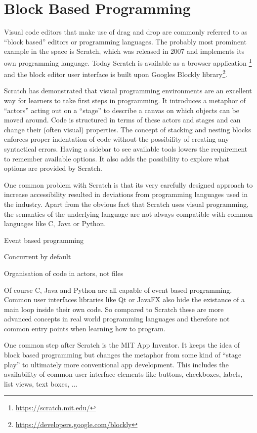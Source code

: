 \documentclass[]{report}
\begin{document}
\section{Block Based Programming}
\label{sec:block-based-programming}

Visual code editors that make use of drag and drop are commonly referred to as \enquote{block based} editors or programming languages. The probably most prominent example in the space is Scratch, which was released in 2007 \cite{maloneyScratchProgrammingLanguage2010} and implements its own programming language. Today Scratch is available as a browser application \footnote{\url{https://scratch.mit.edu/}} and the block editor user interface is built upon Googles Blockly library\footnote{\url{https://developers.google.com/blockly}}.

Scratch has demonstrated that visual programming environments are an excellent way for learners to take first steps in programming. It introduces a metaphor of \enquote{actors} acting out on a \enquote{stage} to describe a canvas on which objects can be moved around. Code is structured in terms of these actors and stages and can change their (often visual) properties. The concept of stacking and nesting blocks enforces proper indentation of code without the possibility of creating any syntactical errors. Having a sidebar to see available tools lowers the requirement to remember available options. It also adds the possibility to explore what options are provided by Scratch.

One common problem with Scratch is that its very carefully designed approach to increase accessibility resulted in deviations from programming languages used in the industry. Apart from the obvious fact that Scratch uses visual programming, the semantics of the underlying language are not always compatible with common languages like C, Java or Python.

Event based programming

Concurrent by default

Organisation of code in actors, not files

Of course C, Java and Python are all capable of event based programming. Common user interfaces libraries like Qt or JavaFX also hide the existance of a main loop inside their own code. So compared to Scratch these are more advanced concepts in real world programming languages and therefore not common entry points when learning how to program.

One common step after Scratch is the MIT App Inventor. It keeps the idea of block based programming but changes the metaphor from some kind of \enquote{stage play} to ultimately more conventional app development. This includes the availability of common user interface elements like buttons, checkboxes, labels, list views, text boxes, ...
\end{document}
